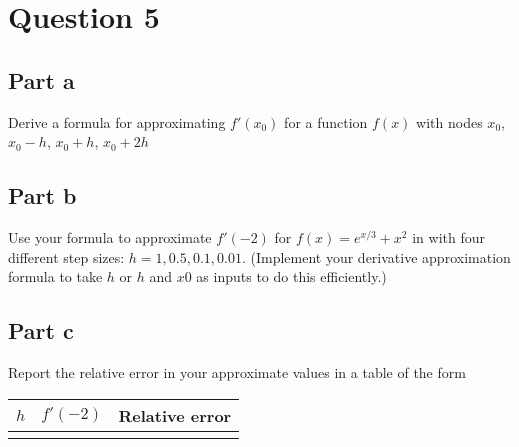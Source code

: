 \section{Question 5}

\subsection{Part a}

\begin{question}
    Derive a formula for approximating $f'(x_0)$ for a function $f(x)$ with nodes $x_0$, $x_0-h$, $x_0+h$, $x_0+2h$
\end{question}

\begin{answer}
    
\end{answer}

\subsection{Part b}

\begin{question}
    Use your formula to approximate $f'(-2)$ for $f(x) = e^{x/3}+x^2$ in  \MATLAB with four different step sizes: $h = 1, 0.5, 0.1, 0.01$. (Implement your derivative approximation formula to take $h$ or $h$ and $x0$ as inputs to do this efficiently.)
\end{question} 

\begin{answer}
    
\end{answer}

\subsection{Part c}

\begin{question}
    Report the relative error in your approximate values in a table of the form
    
    \begin{tabular}
    {c|c|c} 
    $h$ & $f'(-2)$ & Relative error \\
    \hline && 
    \end{tabular}
\end{question}

\begin{answer}
    
\end{answer}    